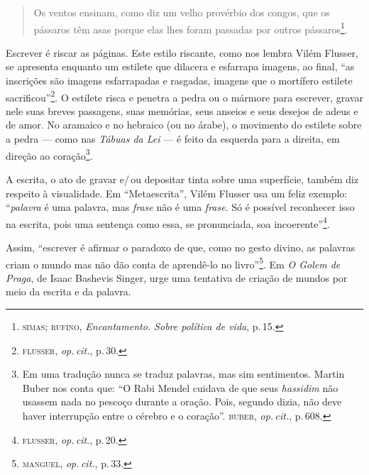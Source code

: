 \begin{quote}
Os ventos ensinam, como diz um velho provérbio dos congos, que os
pássaros têm asas porque elas lhes foram passadas por outros
pássaros\footnote{\textsc{simas}; \textsc{rufino}, \emph{Encantamento. Sobre política de
  vida}, p.\,15.}.
\end{quote}

\begin{center}\end{center}

\noindent{}Escrever é riscar as páginas. Este estilo riscante, como nos lembra
Vilém Flusser, se apresenta enquanto um estilete que dilacera e
esfarrapa imagens, ao final, ``as inscrições são imagens
esfarrapadas e rasgadas, imagens que o mortífero estilete
sacrificou''\footnote{\textsc{flusser}, \emph{op.\,cit.}, p.\,30.}. O estilete risca e
penetra a pedra ou o mármore para escrever, gravar nele suas breves
passagens, suas memórias, seus anseios e seus desejos de adeus e de
amor. No aramaico e no hebraico (ou no árabe), o movimento do estilete
sobre a pedra --- como nas \emph{Tábuas da Lei} --- é feito da esquerda
para a direita, em direção ao coração\footnote{Em uma tradução nunca se
  traduz palavras, mas sim sentimentos. Martin Buber nos conta que:
``O Rabi Mendel cuidava de que seus \emph{hassidim} não usassem nada no
  pescoço durante a oração. Pois, segundo dizia, não deve haver
  interrupção entre o cérebro e o coração''. \textsc{buber}, \emph{op.\,cit.}, p.\,608.}.

A escrita, o ato de gravar e/\,ou depositar tinta sobre uma superfície,
também diz respeito à visualidade. Em ``Metaescrita'', Vilém Flusser usa
um feliz exemplo: ``\emph{palavra} é uma palavra, mas \emph{frase} não é
uma \emph{frase}. Só é possível reconhecer isso na escrita, pois uma sentença
como essa, se pronunciada, soa incoerente''\footnote{\textsc{flusser}, \emph{op.\,cit}., p.\,20.}.

Assim, ``escrever é afirmar o paradoxo de que, como no gesto
divino, as palavras criam o mundo mas não dão conta de aprendê-lo no
livro''\footnote{\textsc{manguel}, \emph{op.\,cit.}, p.\,33.}. Em \emph{O Golem de
Praga}, de Isaac Bashevis Singer, urge uma tentativa de criação
de mundos por meio da escrita e da palavra.

